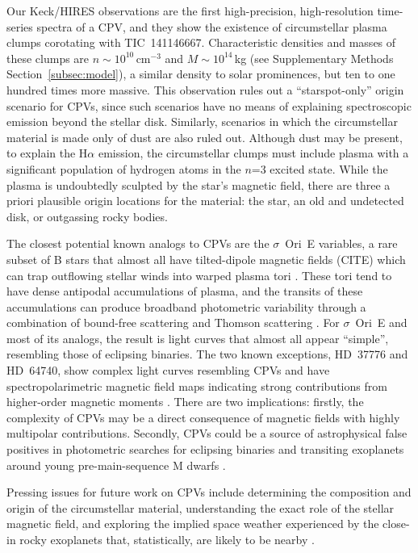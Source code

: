 \documentclass{nature3}
\begin{document}
Our Keck/HIRES observations are the first high-precision,
high-resolution time-series spectra of a CPV, and they show the
existence of circumstellar plasma clumps corotating with
TIC~141146667.  Characteristic densities and masses of these clumps
are $n \sim 10^{10}$\,cm$^{-3}$ and $M \sim 10^{14}$\,kg (see
Supplementary Methods Section~\ref{subsec:model}), a similar density
to solar prominences, but ten to one hundred times more massive.  This
observation rules out a ``starspot-only'' origin scenario for CPVs,
\cite{Koen2021} since such scenarios have no means of explaining
spectroscopic emission beyond the stellar disk.  Similarly, scenarios
in which the circumstellar material is made only of dust are also
ruled out.  Although dust may be present, to explain the H$\alpha$
emission, the circumstellar clumps must include plasma with a
significant population of hydrogen atoms in the $n$=3 excited state.
While the plasma is undoubtedly sculpted by the star's magnetic field,
there are three a priori plausible origin locations for the material:
the star, an old and undetected disk, or outgassing rocky bodies.

The closest potential known analogs to CPVs are the $\sigma$~Ori~E
variables, a rare subset of B stars that almost all have tilted-dipole
magnetic fields (CITE) which can trap outflowing stellar winds into
warped plasma tori \cite{Townsend2005,Townsend2008}.  These tori tend
to have dense antipodal accumulations of plasma, and the transits of
these accumulations can produce broadband photometric variability
through a combination of bound-free scattering \cite{Townsend2005} and
Thomson scattering \citep{Berry2022}.  For $\sigma$~Ori~E and most of
its analogs, the result is light curves that almost all appear
``simple'', resembling those of eclipsing binaries.  The two known
exceptions, HD~37776 and HD~64740, show complex light curves
resembling CPVs \cite{Mikulasek2020,Bouma2024} and have
spectropolarimetric magnetic field maps indicating strong
contributions from higher-order magnetic moments
\cite{Kochukhov2011,Shultz2018}.  There are two implications: firstly,
the complexity of CPVs may be a direct consequence of magnetic fields
with highly multipolar contributions.  Secondly, CPVs could be a
source of astrophysical false positives in photometric searches for
eclipsing binaries and transiting exoplanets around young
pre-main-sequence M dwarfs \cite{Johns-Krull2016,Bouma2020}.

Pressing issues for future work on CPVs include determining the
composition and origin of the circumstellar material, understanding
the exact role of the stellar magnetic field, and exploring the
implied space weather experienced by the close-in rocky exoplanets
that, statistically, are likely to be nearby \cite{Dressing2015}.
\end{document}
